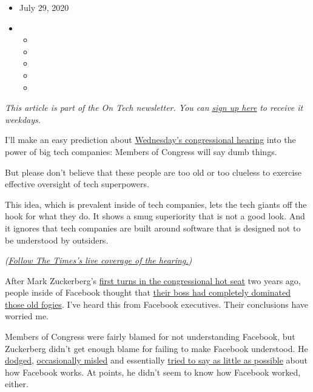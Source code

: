 \begin{itemize}
\item
  July 29, 2020
\item
  \begin{itemize}
  \item
  \item
  \item
  \item
  \item
  \end{itemize}
\end{itemize}

\emph{This article is part of the On Tech newsletter. You can}
\href{https://www.nytimes3xbfgragh.onion/newsletters/signup/OT}{\emph{sign
up here}} \emph{to receive it weekdays.}

I'll make an easy prediction about
\href{https://www.nytimes3xbfgragh.onion/2020/07/28/technology/amazon-apple-facebook-google-antitrust-hearing.html}{Wednesday's
congressional hearing} into the power of big tech companies: Members of
Congress will say dumb things.

But please don't believe that these people are too old or too clueless
to exercise effective oversight of tech superpowers.

This idea, which is prevalent inside of tech companies, lets the tech
giants off the hook for what they do. It shows a smug superiority that
is not a good look. And it ignores that tech companies are built around
software that is designed not to be understood by outsiders.

\emph{(}\href{https://www.nytimes3xbfgragh.onion/live/2020/07/29/technology/tech-ceos-hearing-testimony}{\emph{Follow
The Times's live coverage of the hearing.}}\emph{)}

After Mark Zuckerberg's
\href{https://www.nytimes3xbfgragh.onion/2018/04/12/technology/mark-zuckerberg-testimony.html}{first
turns in the congressional hot seat} two years ago, people inside of
Facebook thought that
\href{https://www.wired.com/story/sigh-of-relief-inside-facebook/}{their
boss had completely dominated those old fogies}. I've heard this from
Facebook executives. Their conclusions have worried me.

Members of Congress were fairly blamed for not understanding Facebook,
but Zuckerberg didn't get enough blame for failing to make Facebook
understood. He
\href{https://www.nytimes3xbfgragh.onion/2018/04/10/technology/zuckerberg-elections-russia-data-privacy.html}{dodged},
\href{https://www.washingtonpost.com/news/fact-checker/wp/2018/04/13/fact-checking-mark-zuckerbergs-testimony-on-facebook-and-data-collection/}{occasionally
misled} and essentially
\href{https://www.bloomberg.com/opinion/articles/2018-04-12/mark-zuckerberg-refuses-to-admit-how-facebook-works}{tried
to say as little as possible} about how Facebook works. At points, he
didn't seem to know how Facebook worked, either.

